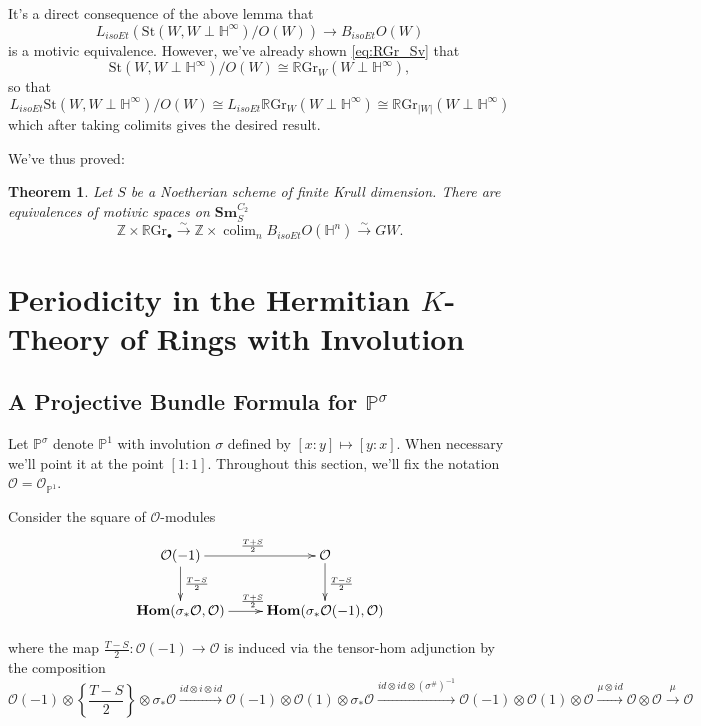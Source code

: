 \documentclass[edeposit,fullpage]{uiucthesis2009}
\newcommand{\Z}{\mathbb Z}
\newcommand{\mbb}{\mathbb}
\newcommand{\mc}{\mathcal}
\newcommand{\RGr}{\mathbb R\mathrm{Gr}}
\newcommand{\Sm}[1]{\mathbf{Sm}_{#1}}
\newcommand{\St}{\mathrm{St}}
\DeclareMathOperator*{\colim}{colim}
\DeclareMathOperator{\iHom}{\mathbf{Hom}}
\theoremstyle{plain}
\numberwithin{lemma}{section}
\newtheorem{theorem}[lemma]{Theorem}
\theoremstyle{definition}
\begin{document}
It's a direct consequence of the above lemma that 
\[
L_{isoEt}(\St(W,W\perp \mbb H^\infty)/O(W))
\rightarrow B_{isoEt}O(W)
\]
is a motivic equivalence. However, we've already shown \eqref{eq:RGr_Sv} that
\[
\St(W,W\perp \mbb H^\infty)/O(W) \cong \RGr_W(W \perp \mbb H^\infty),
\]
so that 
\[
L_{isoEt}\St(W,W\perp \mbb H^\infty)/O(W) \cong L_{isoEt}\RGr_W(W \perp
\mbb H^\infty) \cong \RGr_{|W|}(W \perp \mbb H^\infty)
\]
which after taking colimits gives the desired result. 

We've thus proved:

\begin{theorem}\label{thm:RGr_GW_nonreg}
Let $S$ be a Noetherian scheme of finite Krull dimension. There are
equivalences of motivic spaces on $\Sm{S}^{C_2}$
\[
\Z \times \RGr_\bullet \xrightarrow{\sim} \Z \times \colim_n
B_{isoEt}O(\mbb H^n)
\xrightarrow{\sim} GW.
\]
\end{theorem}

\chapter{Periodicity in the Hermitian $K$-Theory of Rings with Involution}\label{chap:Einf}

\section{A Projective Bundle Formula for $\mbb P^\sigma$}

Let $\mbb P^\sigma$ denote $\mbb P^1$ with involution $\sigma$ defined
by $[x:y] \mapsto
[y:x]$. When necessary we'll point it at the point $[1:1]$. Throughout this section, we'll fix the notation $\mc O = \mc
O_{\mbb P^1}$.

Consider the square of $\mc O$-modules
\begin{equation}\label{diag:prebott}
\xymatrix{\mc O(-1)\ar[r]^{\frac{T+S}{2}}\ar[d]^{\frac{T-S}{2}} & \mc O \ar[d]^{\frac{T-S}{2}} \\ \iHom(\sigma_*\mc
  O,\mc O) \ar[r]^{\frac{T+S}{2}} & \iHom(\sigma_* \mc O(-1),\mc O)}
\end{equation}

where the map $\frac{T-S}{2} : \mc O(-1) \rightarrow \mc
O$ is induced via the tensor-hom adjunction by the composition 
\begin{equation}\label{eq:TminSone}
\mc O(-1) \otimes \left\{\frac{T-S}{2}\right\} \otimes \sigma_* \mc O
\xrightarrow{id \otimes i \otimes id}
\mc O(-1) \otimes \mc O(1) \otimes \sigma_*\mc O  
\xrightarrow{id \otimes id \otimes (\sigma^\#)^{-1}} \mc O(-1) \otimes
\mc O(1) \otimes \mc O \xrightarrow{\mu \otimes id} \mc O \otimes \mc
O \xrightarrow{\mu} \mc O
\end{equation}
\end{document}
